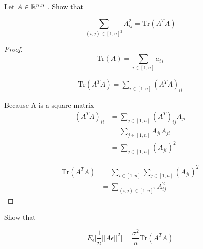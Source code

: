 
Let $A \in \mathbb{R} ^{n, n}$ . Show that

\begin{equation}
    \sum_{(i, j)  \in [1, n]^2} A^2_{ij} =  \mathrm {Tr} (A^T A)
\end{equation}



\begin{proof}
    \begin{equation}
        \mathrm {Tr} (A) =\sum _{i\in[1, n]} a_{{i\,i}}
    \end{equation}
    
    \begin{align*}
        \mathrm {Tr} (A^T A) = \sum_{i \in [1, n]} (A^T A)_{ii}
    \end{align*}

    Because A is a square matrix
    \begin{align*}
        (A^T A)_{ii} &= \sum_{j \in [1, n]} (A^T)_{ij} A_{ji} \\
            &= \sum_{j \in [1, n]} A_{ji} A_{ji}\\
            &= \sum_{j \in [1, n]} (A_{ji})^2
    \end{align*}

    \begin{align*}
         \mathrm {Tr} (A^T A) &= \sum_{i \in [1, n]}  \sum_{j \in [1, n]} (A_{ji})^2\\
            &= \sum_{(i, j)  \in [1, n]^2} A^2_{ij}      
    \end{align*}
\end{proof}


Show that 

\begin{equation} \label{eq:exo3}
    E_\epsilon \Big[ \frac{1}{n} ||A\epsilon ||^2 \Big] = \frac{\sigma^2}{n} \mathrm {Tr} (A^T A)
\end{equation}


